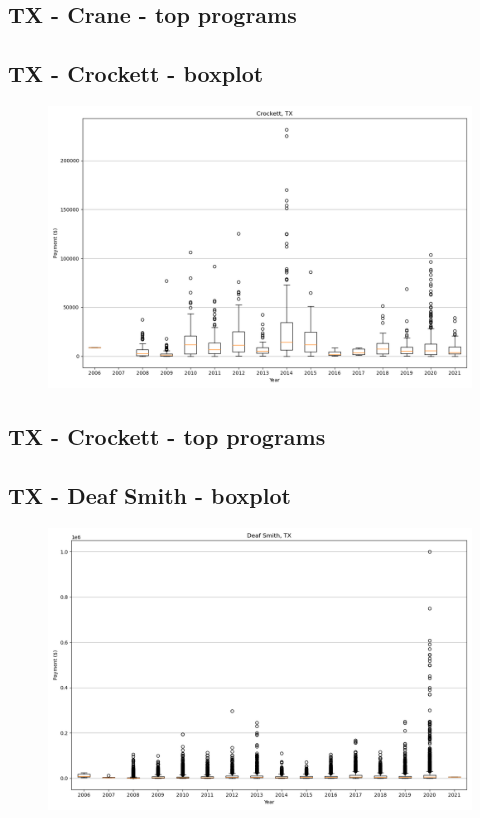 \subsection*{TX - Crane - top programs}

\newpage
\subsection*{TX - Crockett - boxplot}
\begin{figure}[h]
\centering
\includegraphics[width=7in]{../output/boxplots/counties/Crockett-TX_boxplot.png}
\end{figure}


\subsection*{TX - Crockett - top programs}

\newpage
\subsection*{TX - Deaf Smith - boxplot}
\begin{figure}[h]
\centering
\includegraphics[width=7in]{../output/boxplots/counties/Deaf Smith-TX_boxplot.png}
\end{figure}


